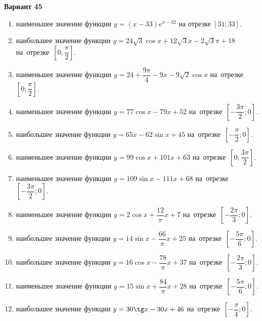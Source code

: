 \documentclass[a4paper,10pt]{article}
\begin{document}
\begin{center}\Large\textbf{Вариант 45}\end{center}

\begin{enumerate}
\item {} наименьшее значение функции $y = \left(x-33\right)e^{x-32}$ на отрезке $\left[31;33\right]$.

\item {} наибольшее значение функции $y = 24\sqrt{3}\cos x+12\sqrt{3}x-2\sqrt{3}\pi +18$ на~отрезке~$\left[0;\dfrac{\pi }{2}\right]$.

\item {} наименьшее значение функции $y = 24+\dfrac{9 \pi}{4}-9x-9\sqrt{2}\cos x$ на~отрезке~$\left[0;\dfrac{\pi }{2}\right]$.

\item {} наименьшее значение функции $y = 77\cos x-79x+52$ на~отрезке~$\left[-\dfrac{3\pi }{2};0\right]$.

\item {} наибольшее значение функции $y = 65x-62\sin x+45$ на~отрезке~$\left[-\dfrac{\pi }{2};0\right]$.

\item {} наименьшее значение функции $y = 99\cos x+101x+63$ на~отрезке~$\left[0;\dfrac{3\pi }{2}\right]$.

\item {} наименьшее значение функции $y = 109\sin x-111x+68$ на~отрезке~$\left[-\dfrac{3\pi }{2};0\right]$.

\item {} наименьшее значение функции $y = 2\cos x+\dfrac{12}{\pi }x +7$ на~отрезке~$\left[-\dfrac{2\pi }{3};0\right]$.

\item {} наибольшее значение функции $y = 14\sin x-\dfrac{66}{\pi }x+25$ на~отрезке~$\left[-\dfrac{5\pi }{6};0\right]$.

\item {} наибольшее значение функции $y = 16\cos x-\dfrac{78}{\pi }x+37$ на~отрезке~$\left[-\dfrac{2\pi }{3};0\right]$.

\item {} наименьшее значение функции $y = 15\sin x+\dfrac{84}{\pi }x+28$ на~отрезке~$\left[-\dfrac{5\pi }{6};0\right]$.

\item {} наибольшее значение функции $y = 30\tg x-30x+46$ на~отрезке~$\left[-\dfrac{\pi }{4};0\right]$.


\end{enumerate}
\end{document}
